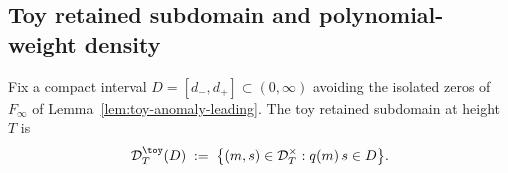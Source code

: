 %
%
%


\subsection{Toy retained subdomain and polynomial-weight density}
\label{subsec:toy-retained-subdomain}

\begin{definition}
\label{def:toy-retained-subdomain}
Fix a compact interval \(D=[d_-,d_+]\subset(0,\infty)\) avoiding the
isolated zeros of \(F_{\infty}\) of
Lemma~\ref{lem:toy-anomaly-leading}.  The toy retained subdomain at
height \(T\) is
\begin{equation}
\label{eq:toy-retained-subdomain}
        \mathcal D_T^\toy(D)
        \;:=\;\bigl\{(m,s)\in\mathcal D_T^\times :
            q(m)\,s\in D\bigr\}.
\end{equation}
\end{definition}

